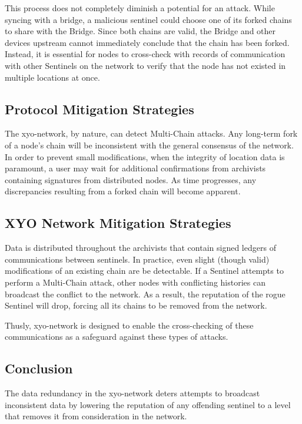 \documentclass{article}
\begin{document}
This process does not completely diminish a potential for an attack. While syncing with a \Gls{bridge}, a malicious \Gls{sentinel} could choose one of its forked chains to share with the Bridge. Since both chains are valid, the Bridge and other  devices upstream cannot immediately conclude that the chain has been forked. Instead, it is essential for nodes to cross-check with records of communication with other Sentinels on the network to verify that the node has not existed in multiple locations at once. 

\subsection{Protocol Mitigation Strategies}

The \Gls{xyo-network}, by nature, can detect Multi-Chain attacks. Any long-term fork of a node's chain will be inconsistent with the general consensus of the network. In order to prevent small modifications, when the integrity of location data is paramount, a user may wait for additional confirmations from \Glspl{archivist} containing signatures from distributed nodes. As time progresses, any discrepancies resulting from a forked chain will become apparent.

\subsection{XYO Network Mitigation Strategies}

Data is distributed throughout the \Glspl{archivist} that contain signed ledgers of communications between \Glspl{sentinel}. In practice, even slight (though valid) modifications of an existing chain are be detectable. If a Sentinel attempts to perform a Multi-Chain attack, other nodes with conflicting histories can broadcast the conflict to the network. As a result, the reputation of the rogue Sentinel will drop, forcing all its chains to be removed from the network.

Thusly, \Gls{xyo-network} is designed to enable the cross-checking of these communications as a safeguard against these types of attacks.

\subsection{Conclusion}

The data redundancy in the \Gls{xyo-network} deters attempts to broadcast inconsistent data by lowering the reputation of any offending \Gls{sentinel} to a level that removes it from consideration in the network.
\end{document}
